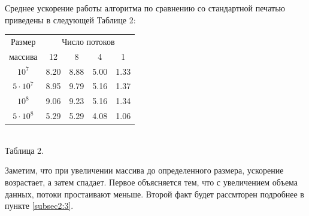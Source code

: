 Среднее ускорение работы алгоритма по сравнению со стандартной печатью приведены в следующей Таблице 2:
\begin{center}
\begin{tabular}{||c|c|c|c|c||}
\hline
\hline
Размер & \multicolumn{4}{c||}{Число потоков}\\
\hhline{~|-|-|-|-|}
массива & 12 & 8 & 4 & 1 \\
\hline
$10^7$ & 8.20 & 8.88 & 5.00 & 1.33 \\
\hline
$5 \cdot 10^7$ & 8.95 & 9.79 & 5.16 & 1.37 \\
\hline
$10^8$ & 9.06 & 9.23 & 5.16 & 1.34\\
\hline
$5 \cdot 10^8$ & 5.29 & 5.29 & 4.08 & 1.06\\
\hline
\hline
\end{tabular}
\\\vspace{10pt}
\small{Таблица 2.}
\end{center}

Заметим, что при увеличении массива до определенного размера, ускорение возрастает, а затем спадает.
Первое объясняется тем, что с увеличением объема данных, потоки простаивают меньше.
Второй факт будет рассмторен подробнее в пункте \ref{subsec2:3}.

